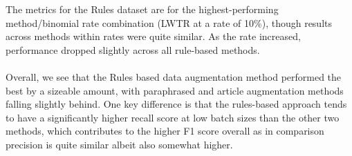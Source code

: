 \documentclass[12pt]{report}
\begin{document}
        The metrics for the Rules dataset are for the highest-performing \\method/binomial rate combination (LWTR at a rate of 10\%), though results across methods within rates were quite similar. As the rate increased, performance dropped slightly across all rule-based methods.
        \\\\
        Overall, we see that the Rules based data augmentation method performed the best by a sizeable amount, with paraphrased and article augmentation methods falling slightly behind. One key difference is that the rules-based approach tends to have a significantly higher recall score at low batch sizes than the other two methods, which contributes to the higher F1 score overall as in comparison precision is quite similar albeit also somewhat higher.
        
\end{document}
